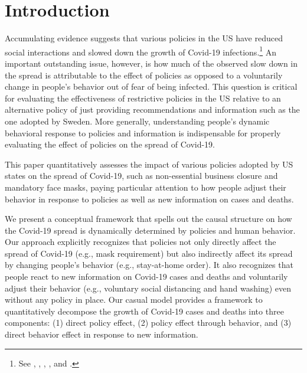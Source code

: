 \documentclass[11pt,reqno,letter]{amsart}
\theoremstyle{definition}
\begin{document}
\maketitle






 \section{Introduction}


Accumulating evidence suggests that various policies in the US have reduced social interactions and slowed down the growth of Covid-19  infections.\footnote{
See
\citet{courtemanche2020}, \citet{hsiang2020}, \citet{pei2020},  \citet{abouk2020}, and \cite{wright2020}.} An important outstanding issue, however, is how much of the observed slow down in the spread is attributable to the effect of policies as opposed to a voluntarily change in people's behavior out of fear of being infected. This question is critical for evaluating the effectiveness of restrictive policies  in the US relative to an alternative policy of just providing recommendations and information such as the one adopted by Sweden.  More generally, understanding people's dynamic  behavioral response to policies and information  is indispensable for properly evaluating the effect of policies on the spread of Covid-19.


This paper  quantitatively assesses the impact of various policies adopted by US states on the spread of Covid-19, such as non-essential business closure and mandatory  face masks, paying particular attention to how people adjust their behavior in response to policies as well as new information on cases and deaths.

We present a conceptual framework that spells out the causal structure on how the Covid-19 spread is dynamically determined by policies and human behavior. Our approach explicitly recognizes that policies not only directly affect the spread of Covid-19 (e.g., mask requirement) but also indirectly affect its spread by changing people's behavior (e.g., stay-at-home order). It also recognizes that people react to new information on Covid-19 cases and deaths and voluntarily adjust their behavior (e.g., voluntary social distancing and hand washing) even without any policy in place. Our casual model provides a framework to quantitatively decompose the growth of Covid-19 cases and deaths into three components: (1) direct policy effect, (2) policy effect through behavior, and (3) direct behavior effect in response to new information. 
\end{document}
